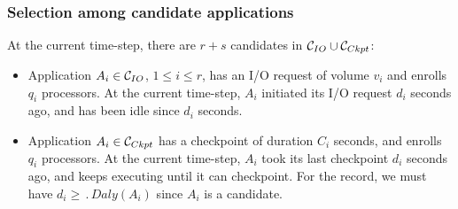 \subsubsection{Selection among candidate applications}

At the current time-step, there are $r+s$ candidates in $\mathcal{C}_{IO} \cup \mathcal{C}_{Ckpt}$:
\begin{itemize}
  \item Application $A_{i} \in \mathcal{C}_{IO}$, $1\leq i \leq r$,
  has an I/O request of volume $v_{i}$ and enrolls $q_{i}$ processors. At the current time-step, $A_{i}$ initiated its I/O request $d_{i}$ seconds ago, and has been idle since $d_{i}$ seconds.
 \item Application $A_{i} \in  \mathcal{C}_{Ckpt}$ has a checkpoint of duration $C_{i}$ seconds,
  and enrolls $q_{i}$ processors. At the current time-step, $A_{i}$ took its last checkpoint
  $d_{i}$ seconds ago, and keeps executing until it can checkpoint. For the record, we must have $d_{i} \geq \period{Daly}(A_{i})$
  since $A_{i}$ is a candidate.
\end{itemize}

